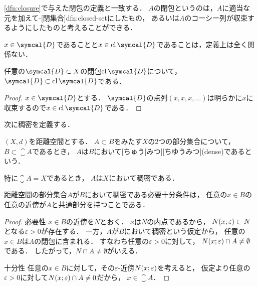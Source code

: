 \documentclass[../sotsu.tex]{subfiles}
\begin{document}
\cref{dfn:closure}で与えた閉包の定義と一致する．
$A$の閉包というのは，$A$に適当な元を加えて-[閉集合]{dfn:closed-set}にしたもの，
あるいは$A$のコーシー列が収束するようにしたものと考えることができる．

$x \in \symcal{D}$であることと$x \in \closure{\symcal{D}}$であることは，定義上は全く関係ない．

\begin{corollary}
    任意の$\symcal{D} \subset X$の閉包$\closure{\symcal{D}}$について，
    $\symcal{D} \subset \closure{\symcal{D}}$である．
\end{corollary}

\begin{proof}
    $x \in \symcal{D}$とする．
    $\symcal{D}$の点列$(x, x, x, \dotsc)$は明らかに$x$に収束するので$x \in \closure{\symcal{D}}$である．
\end{proof}

次に稠密を定義する．

\begin{definition}[稠密]
    \label{dfn:dense}
    $(X, d)$を距離空間とする．
    $A \subset B$をみたす$X$の2つの部分集合について，
    $B \subset \closure{A}$であるとき，
    $A$は$B$において[ちゅう|みつ][ちゆうみつ](dense)であるという\cite{iwanami-functional}．

    特に$\closure{A} = X$であるとき，
    $A$は$X$において稠密である．
\end{definition}

\begin{proposition}
    距離空間の部分集合$A$が$B$において稠密である必要十分条件は，
    任意の$x \in B$の任意の近傍が$A$と共通部分を持つことである\cite{iwanami-functional}．
\end{proposition}

\begin{proof}
    \textsf{必要性} \quad 
    $x \in B$の近傍を$N$とおく．
    $x$は$N$の内点であるから，
    $N(x; \varepsilon) \subset N$となる$\varepsilon > 0$が存在する．
    一方，$A$が$B$において稠密という仮定から，
    任意の$x \in B$は$A$の閉包に含まれる．
    すなわち任意の$\varepsilon > 0$に対して，
    $N(x; \varepsilon) \cap A \neq \emptyset$である．
    したがって，$N \cap A \neq \emptyset$がいえる．

    \textsf{十分性} \quad 
    任意の$x \in B$に対して，その$\varepsilon$-近傍$N(x; \varepsilon)$を考えると，
    仮定より任意の$\varepsilon > 0$に対して$N(x; \varepsilon) \cap A \neq 0$だから，
    $x \in \closure{A}$．
\end{proof}
\end{document}
